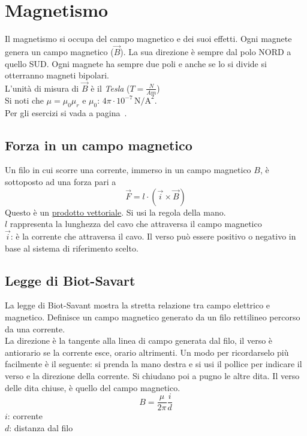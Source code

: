 
\section{Magnetismo}\label{sec:magnetismo}
Il magnetismo si occupa del campo magnetico e dei suoi effetti. Ogni magnete genera un
campo magnetico ($\vec{B}$). La sua direzione è sempre dal polo NORD a quello SUD. Ogni magnete ha
sempre due poli e anche se lo si divide si otterranno magneti bipolari.\\ 
L'unità di misura di $\vec{B}$ è il \emph{Tesla} ($T = \frac{N}{Am}$)\\
Si noti che $\mu = \mu_0\mu_r$ e \hyperref[tab:mu0]{$\mu_0$}: $4\pi\cdot10^{-7}\,\text{N/A}^2$.\\
Per gli esercizi si vada a pagina~\pageref{ex:magnetismo}.

\subsection{Forza in un campo magnetico}
Un filo in cui scorre una corrente, immerso in un campo magnetico $B$, è sottoposto ad una forza
pari a
\begin{equation*}	
  \vec{F} = l\cdot(\vec{i}\times\vec{B})
\end{equation*}
Questo è un \hyperref[subsec:vettori:prodottoVettoriale]{prodotto vettoriale}. Si usi la regola
della mano.\\
$l$ rappresenta la lunghezza del cavo che attraversa il campo magnetico\\
$\vec{i}$: è la corrente che attraversa il cavo. Il verso può essere positivo o
negativo in base al sistema di riferimento scelto.

\subsection{Legge di Biot-Savart}
La legge di Biot-Savant mostra la stretta relazione tra campo elettrico e magnetico. Definisce un 
campo magnetico generato da un filo rettilineo percorso da una corrente.\\
La direzione è la tangente alla linea di campo generata dal filo, il verso è antiorario se la
corrente esce, orario altrimenti. Un modo per ricordarselo più facilmente è il seguente: si prenda la
mano destra e si usi il pollice per indicare il verso e la direzione della corrente. Si chiudano poi
a pugno le altre dita. Il verso delle dita chiuse, è quello del campo magnetico.
\begin{equation*}
  B = \frac{\mu}{2\pi}\frac{i}{d}
\end{equation*}
$i$: corrente\\
$d$: distanza dal filo\\ [\baselineskip]

